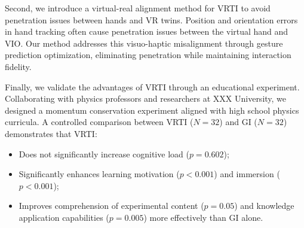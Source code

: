 Second, we introduce a virtual-real alignment method for VRTI to avoid penetration issues between hands and VR twins. Position and orientation errors in hand tracking often cause penetration issues between the virtual hand and VIO. Our method addresses this visuo-haptic misalignment through gesture prediction optimization, eliminating penetration while maintaining interaction fidelity.

Finally, we validate the advantages of VRTI through an educational experiment. Collaborating with physics professors and researchers at XXX
University, we designed a momentum conservation experiment aligned with high school physics curricula. A controlled comparison between VRTI ($N=32$) and GI ($N=32$) demonstrates that VRTI:

\begin{itemize}
  \item Does not significantly increase cognitive load ($p = 0.602$);

  \item Significantly enhances learning motivation ($p < 0.001$) and immersion ($p < 0.001$);

  \item Improves comprehension of experimental content ($p = 0.05$) and knowledge application capabilities ($p = 0.005$) more effectively than GI alone.
\end{itemize}